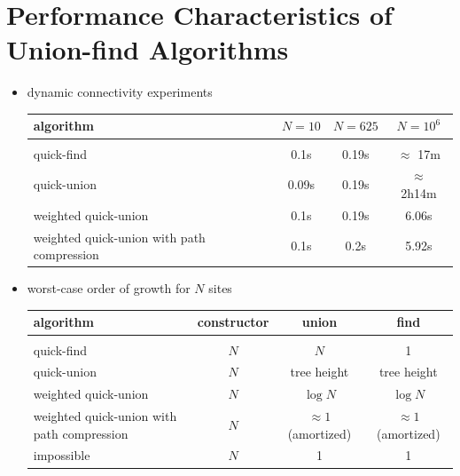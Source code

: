 \documentclass[8pt,a4paper,compress]{beamer}
\begin{document}
\section{Performance Characteristics of Union-find Algorithms}
\begin{frame}[fragile]
\begin{itemize}
\item dynamic connectivity experiments
\begin{center}
\begin{tabular}{p{3cm}ccc}
\centering \textbf{algorithm} & \textbf{$N=10$} & \textbf{$N=625$} & \textbf{$N=10^6$} \\ \hline \\
\centering quick-find & 0.1s & 0.19s & $\approx$ 17m \\
\centering quick-union & 0.09s & 0.19s & $\approx$ 2h14m \\
\centering weighted quick-union & 0.1s & 0.19s & 6.06s \\
\centering weighted quick-union with path compression & 0.1s & 0.2s & 5.92s
\end{tabular} 
\end{center}

\item worst-case order of growth for $N$ sites
\begin{center}
\begin{tabular}{p{3cm}ccc}
\centering \textbf{algorithm} & \textbf{constructor} & \textbf{union} & \textbf{find} \\ \hline \\
\centering quick-find & $N$ & $N$ & 1 \\
\centering quick-union & $N$ & tree height & tree height \\
\centering weighted quick-union & $N$ & $\log N$ & $\log N$ \\
\centering weighted quick-union with path compression & $N$ & $\approx 1$ (amortized) & $\approx 1$ (amortized) \\
\centering impossible & $N$ & 1 & 1
\end{tabular} 
\end{center}
\end{itemize}
\end{frame}
\end{document}
